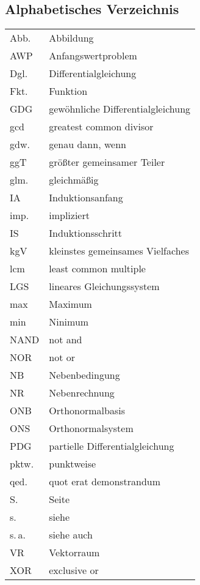 \subsection{Alphabetisches Verzeichnis}
\begin{tabular}{ll}
Abb. & Abbildung\\
AWP & Anfangswertproblem\\
Dgl. & Differentialgleichung\\
Fkt. & Funktion\\
GDG & gewöhnliche Differentialgleichung\\
gcd & greatest common divisor\\
gdw. & genau dann, wenn\\
ggT & größter gemeinsamer Teiler\\
glm. & gleichmäßig\\
IA & Induktionsanfang\\
imp. & impliziert\\
IS & Induktionsschritt\\
kgV & kleinstes gemeinsames Vielfaches\\
lcm & least common multiple\\
LGS & lineares Gleichungssystem\\
max & Maximum\\
min & Ninimum\\
NAND & not and\\
NOR & not or\\
NB & Nebenbedingung\\
NR & Nebenrechnung\\
ONB & Orthonormalbasis\\
ONS & Orthonormalsystem\\
PDG & partielle Differentialgleichung\\
pktw. & punktweise\\
qed. & quot erat demonstrandum\\
S. & Seite\\
s. & siehe\\
s.\,a. & siehe auch\\
VR & Vektorraum\\
XOR & exclusive or
\end{tabular}

\newpage\vglue 10pt

